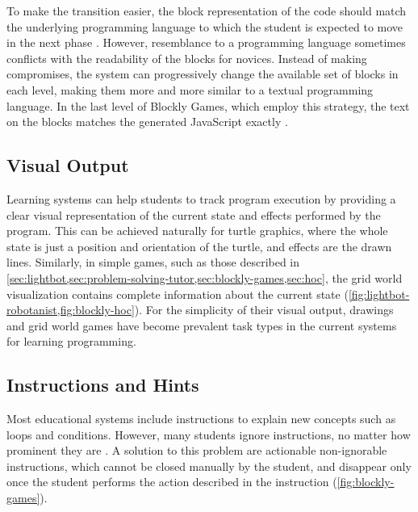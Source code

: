 To make the transition easier, the block representation of the code
  should match the underlying programming language
  to which the student is expected to move in the next phase
  \cite{challenges-of-blocks-based-environments}.
However, resemblance to a programming language sometimes
  conflicts with the readability of the blocks for novices.
Instead of making compromises,
  the system can progressively change the available set of blocks in each level,
  making them more and more similar to a textual programming language.
In the last level of Blockly Games, which employ this strategy,
  the text on the blocks matches the generated JavaScript exactly
  \cite{blockly-10-things}.



\subsection{Visual Output}
\label{sec:visual-output}

Learning systems can help students to track program execution
  by providing a clear visual representation of the current state
  and effects performed by the program.
This can be achieved naturally for turtle graphics,
  where the whole state is just a position and orientation of the turtle,
  and effects are the drawn lines.
Similarly, in simple games, such as those described in
  \cref{sec:lightbot,sec:problem-solving-tutor,sec:blockly-games,sec:hoc},
  the grid world visualization contains complete information about the current
  state (\cref{fig:lightbot-robotanist,fig:blockly-hoc}).
For the simplicity of their visual output,
  drawings and grid world games have become prevalent task types
  in the current systems for learning programming.

\subsection{Instructions and Hints}
\label{sec:instructions-and-hints}

Most educational systems include instructions
  to explain new concepts such as loops and conditions.
However, many students ignore instructions,
  no matter how prominent they are \cite{blockly-10-things}.
A solution to this problem are actionable non-ignorable instructions,
  which cannot be closed manually by the student, and disappear only once the
  student performs the action described in the instruction
  (\cref{fig:blockly-games}).

